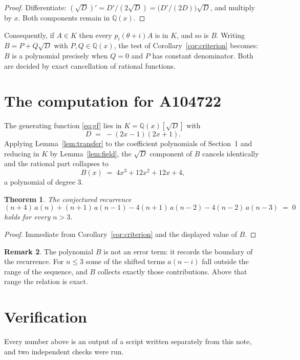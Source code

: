 \documentclass[11pt,a4paper]{article}
\theoremstyle{plain}
\newtheorem{theorem}{Theorem}
\theoremstyle{definition}
\newtheorem{remark}[theorem]{Remark}
\begin{document}
\begin{proof}
Differentiate: $(\sqrt{D})'=D'/(2\sqrt{D})=\bigl(D'/(2D)\bigr)\sqrt{D}$, and multiply by
$x$. Both components remain in $\mathbb{Q}(x)$.
\end{proof}

Consequently, if $A\in K$ then every $p_{i}(\theta+i)A$ is in $K$, and so is $B$. Writing
$B=P+Q\sqrt{D}$ with $P,Q\in\mathbb{Q}(x)$, the test of Corollary~\ref{cor:criterion}
becomes: $B$ is a polynomial precisely when $Q=0$ and $P$ has constant denominator. Both
are decided by exact cancellation of rational functions.

\section{The computation for A104722}

The generating function \eqref{eq:gf} lies in $K=\mathbb{Q}(x)[\sqrt{D}]$ with
\[
D \;=\; - \left(2 x - 1\right) \left(2 x + 1\right) .
\]
Applying Lemma~\ref{lem:transfer} to the coefficient polynomials of Section~1 and reducing
in $K$ by Lemma~\ref{lem:field}, the $\sqrt{D}$ component of $B$ cancels identically and
the rational part collapses to
\[
B(x)\;=\;4 x^{3} + 12 x^{2} + 12 x + 4 ,
\]
a polynomial of degree $3$.

\begin{theorem}
The conjectured recurrence
\[
(n + 4)\,a(n) + (n + 1)\,a(n-1) -  4 \left(n + 1\right)\,a(n-2) -  4 \left(n - 2\right)\,a(n-3) \;=\;0
\]
holds for every $n>3$.
\end{theorem}

\begin{proof}
Immediate from Corollary~\ref{cor:criterion} and the displayed value of $B$.
\end{proof}

\begin{remark}
The polynomial $B$ is not an error term: it records the boundary of the recurrence. For
$n\le3$ some of the shifted terms $a(n-i)$ fall outside the range of the sequence,
and $B$ collects exactly those contributions. Above that range the relation is exact.
\end{remark}

\section{Verification}

Every number above is an output of a script written separately from this note, and two
independent checks were run.
\end{document}
